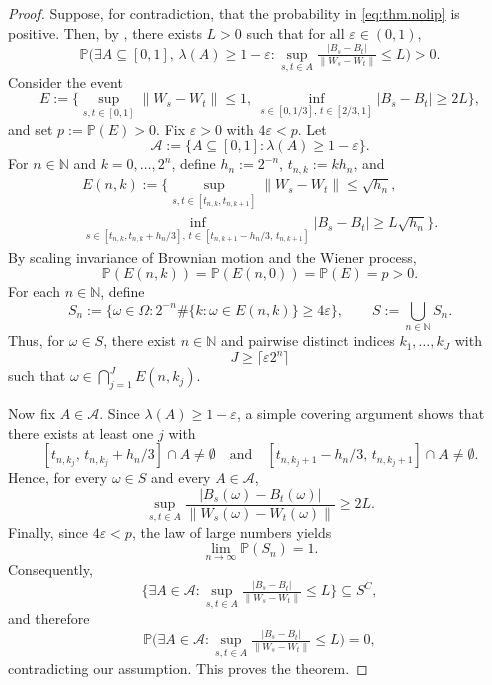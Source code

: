 \documentclass[10pt,a4paper]{amsart}
\renewcommand{\epsilon}{\varepsilon}
\begin{document}
\begin{proof}
    Suppose, for contradiction, that the probability in \eqref{eq:thm.nolip} is positive. 
    Then, by , there exists $L > 0$ such that for all $\epsilon \in (0,1)$,
    \[
        \mathbb P \Big( \exists A \subseteq [0,1], \, \lambda(A) \ge 1 - \epsilon : \sup_{s,t \in A} \tfrac{|B_s - B_t|}{\|W_s - W_t\|} \le L \Big) > 0.
    \]
    Consider the event
    \[
        E := \Big\{ \sup_{s,t \in [0,1]} \|W_s - W_t\| \le 1, \ \inf_{s \in [0,1/3], \, t \in [2/3,1]} |B_s - B_t| \ge 2L \Big\},
    \]
    and set $p := \mathbb P(E) > 0$. 
    Fix $\epsilon > 0$ with $4 \epsilon < p$.
    Let
    \[
        \mathcal A := \{ A \subseteq [0,1] : \lambda(A) \ge 1 - \epsilon \}.
    \]
    For $n \in \mathbb N$ and $k = 0,\dots,2^n$, define $h_n := 2^{-n}$, $t_{n,k} := k h_n$, and
    \begin{multline*}
        E(n,k) := \Big\{ \sup_{s,t \in [t_{n,k},t_{n,k+1}]} \|W_s - W_t\| \le \sqrt{h_n}, \\
        \inf_{s \in [t_{n,k}, t_{n,k} + h_n/3], \, t \in [t_{n,k+1} - h_n/3, \, t_{n,k+1}]} |B_s - B_t| \ge L \sqrt{h_n} \Big\}.
    \end{multline*}
    By scaling invariance of Brownian motion and the Wiener process,
    \[
        \mathbb P(E(n,k)) = \mathbb P(E(n,0)) = \mathbb P(E) = p > 0.
    \]
    For each $n \in \mathbb N$, define
    \[
        S_n := \Big\{ \omega \in \Omega : 2^{-n} \# \{ k : \omega \in E(n,k) \} \ge 4 \epsilon \Big\},
    \qquad 
        S := \bigcup_{n \in \mathbb N} S_n.
    \]
    Thus, for $\omega \in S$, there exist $n \in \mathbb N$ and pairwise distinct indices $k_1,\dots,k_J$ with 
    \[
        J \ge \lceil \epsilon 2^n \rceil
    \]
    such that $\omega \in \bigcap_{j=1}^J E(n,k_j)$.

    Now fix $A \in \mathcal A$. 
    Since $\lambda(A) \ge 1 - \epsilon$, a simple covering argument shows that there exists at least one $j$ with
    \[
        [t_{n,k_j}, \, t_{n,k_j} + h_n/3] \cap A \neq \emptyset 
        \quad \text{and} \quad
        [t_{n,k_j+1} - h_n/3, \, t_{n,k_j+1}] \cap A \neq \emptyset.
    \]
    Hence, for every $\omega \in S$ and every $A \in \mathcal A$,
    \[
        \sup_{s,t \in A} \frac{|B_s(\omega) - B_t(\omega)|}{\|W_s(\omega) - W_t(\omega)\|} \ge 2L.
    \]
    Finally, since $4\epsilon < p$, the law of large numbers yields
    \[
        \lim_{n \to \infty} \mathbb P(S_n) = 1.
    \]
    Consequently,
    \[
        \Big\{ \exists A \in \mathcal A : \sup_{s,t \in A} \tfrac{|B_s - B_t|}{\|W_s - W_t\|} \le L \Big\} \subseteq S^C,
    \]
    and therefore
    \[
        \mathbb P\Big( \exists A \in \mathcal A : \sup_{s,t \in A} \tfrac{|B_s - B_t|}{\|W_s - W_t\|} \le L \Big) = 0,
    \]
    contradicting our assumption. 
    This proves the theorem.
\end{proof}
\end{document}
